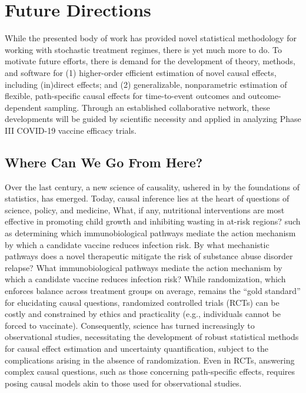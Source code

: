 \chapter{Future Directions}\label{five}

While the presented body of work has provided novel statistical methodology for
working with stochastic treatment regimes, there is yet much more to do. To
motivate future efforts, there is demand for the development of theory, methods,
and software for (1) higher-order efficient estimation of novel causal effects,
including (in)direct effects; and (2) generalizable, nonparametric estimation of
flexible, path-specific causal effects for time-to-event outcomes and
outcome-dependent sampling. Through an established collaborative network, these
developments will be guided by scientific necessity and applied in analyzing
Phase III COVID-19 vaccine efficacy trials.

\section{Where Can We Go From Here?}

Over the last century, a new science of causality, ushered in by the foundations
of statistics, has emerged. Today, causal inference lies at the heart of
questions of science, policy, and medicine, What, if any, nutritional
interventions are most effective in promoting child growth and inhibiting
wasting in at-risk regions? such as determining which immunobiological pathways
mediate the action mechanism by which a candidate vaccine reduces infection
risk. By what mechanistic pathways does a novel therapeutic mitigate the risk of
substance abuse disorder relapse? What immunobiological pathways mediate the
action mechanism by which a candidate vaccine reduces infection risk? While
randomization, which enforces balance across treatment groups on average,
remains the ``gold standard'' for elucidating causal questions, randomized
controlled trials (RCTs) can be costly and constrained by ethics and
practicality (e.g., individuals cannot be forced to vaccinate). Consequently,
science has turned increasingly to observational studies, necessitating the
development of robust statistical methods for causal effect estimation and
uncertainty quantification, subject to the complications arising in the absence
of randomization. Even in RCTs, answering complex causal questions, such as
those concerning path-specific effects, requires posing causal models akin to
those used for observational studies.

